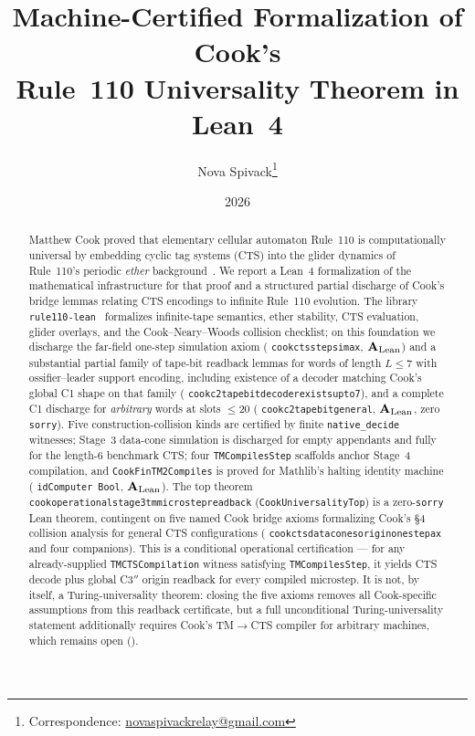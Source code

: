 \documentclass[11pt]{article}
\title{\bfseries Machine-Certified Formalization of Cook's\\[0.2em]
Rule~110 Universality Theorem in Lean~4}
\author[1]{Nova Spivack\thanks{Correspondence:
  \href{mailto:novaspivackrelay@gmail.com}{novaspivackrelay@gmail.com}}}
\affil[1]{Independent Research}
\date{2026}
\theoremstyle{remark}
\newcommand{\CatAL}{\ensuremath{\textbf{A}_{\rm Lean}}}
\newcommand{\lean}[1]{%
  \penalty-100
  \begingroup\def\_{\textunderscore\allowbreak}\texttt{#1}\endgroup}
\begin{document}
\maketitle
\NovaZenodoAfterTitle

\begin{abstract}
Matthew Cook proved that elementary cellular automaton Rule~110 is computationally universal
by embedding cyclic tag systems (CTS) into the glider dynamics of Rule~110's periodic
\emph{ether} background~\cite{Cook2004,Cook2009}.
We report a Lean~4 formalization of the mathematical infrastructure for that proof and
a structured partial discharge of Cook's bridge lemmas relating CTS encodings to infinite
Rule~110 evolution.
The library \texttt{rule110-lean}~\cite{rule110-lean} formalizes infinite-tape semantics,
ether stability, CTS evaluation, glider overlays, and the Cook--Neary--Woods collision
checklist; on this foundation we discharge the far-field one-step simulation axiom
(\lean{cook\_cts\_step\_sim\_ax}, $\CatAL$) and a substantial partial family of
tape-bit readback lemmas for words of length $L \le 7$ with ossifier--leader support
encoding, including existence of a decoder matching Cook's global C1 shape on that family
(\lean{cook\_c2\_tape\_bit\_decoder\_exists\_upto7}),
and a complete C1 discharge for \emph{arbitrary} words at slots $\le 20$
(\lean{cook\_c2\_tape\_bit\_general}, $\CatAL$, zero \texttt{sorry}).
Five construction-collision kinds are certified by finite \texttt{native\_decide} witnesses;
Stage~3 data-cone simulation is discharged for empty appendants and fully for the
length-$6$ benchmark CTS; four \lean{TMCompilesStep} scaffolds anchor Stage~4 compilation,
and \lean{CookFinTM2Compiles} is proved for Mathlib's halting identity machine
(\lean{idComputer Bool}, $\CatAL$).
The top theorem \lean{cook\_operational\_stage3\_tm\_microstep\_readback}
(\texttt{CookUniversalityTop}) is a zero-\texttt{sorry} Lean theorem, contingent on five
named Cook bridge axioms formalizing Cook's \S4 collision analysis for general CTS
configurations (\lean{cook\_cts\_data\_cones\_origin\_one\_step\_ax} and four companions).
This is a conditional operational certification --- for any already-supplied
\lean{TMCTSCompilation} witness satisfying \lean{TMCompilesStep}, it yields CTS decode plus
global C3$''$ origin readback for every compiled microstep.  It is not, by itself, a Turing-universality
theorem: closing the five axioms removes all Cook-specific assumptions from this readback
certificate, but a full unconditional Turing-universality statement additionally requires
Cook's TM$\to$CTS compiler for arbitrary machines, which remains open ().
\end{abstract}
\end{document}
